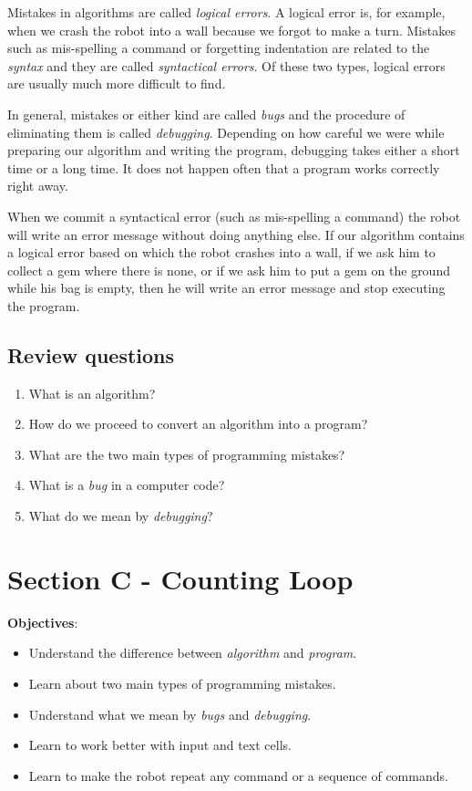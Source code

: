 \documentclass[article,A4,12pt]{llncs}
\begin{document}
Mistakes in algorithms are called {\em logical errors}. A logical error is, for 
example, when we crash the robot into a wall because we forgot to make a turn.
Mistakes such as mis-spelling a command or forgetting indentation are related to 
the {\em syntax} and they are called {\em syntactical errors}. Of these two types, 
logical errors are usually much more difficult to find. 

In general, mistakes or either kind are called {\em bugs} and the procedure of 
eliminating them is called {\em debugging}. Depending on how careful we 
were while preparing our algorithm and writing the program, debugging takes either 
a short time or a long time. It does not happen often that a program works correctly
right away. 

When we commit a syntactical error (such as mis-spelling a command)
the robot will write an error message without doing anything else.
If our algorithm contains a logical error based on which the robot crashes 
into a wall, if we ask him to collect a gem where there is none, or if we 
ask him to put a gem on the ground while his bag is empty, then he will
write an error message and stop executing the program. 

\subsection{Review questions} 

\begin{enumerate}
\item What is an algorithm?
\item How do we proceed to convert an algorithm into a program?
\item What are the two main types of programming mistakes?
\item What is a {\em bug} in a computer code?
\item What do we mean by {\em debugging}?
\end{enumerate}

\section{Section C - Counting Loop}

\noindent
{\bf Objectives}: 
\begin{itemize}
\item Understand the difference between {\em algorithm} and {\em program}. 
\item Learn about two main types of programming mistakes.
\item Understand what we mean by {\em bugs} and {\em debugging}.
\item Learn to work better with input and text cells.
\item Learn to make the robot repeat any command or a sequence of commands.
\end{itemize}
\end{document}
